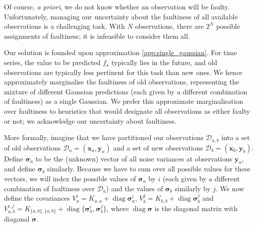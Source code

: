 \documentclass{article} %
\newcommand{\deq}{=}
\newcommand{\cm}[1]{\ensuremath{\mathcal{#1}}}
\newcommand{\bm}[1]{\ensuremath{\mathbf{#1}}}
\newcommand{\data}{\ensuremath{\cm{D}}}
\newcommand{\vect}[1]{\bm{#1}}
\newcommand{\vy}{\vect{y}}
\newcommand{\vx}{\vect{x}}
\newcommand{\vs}{\vect{\sigma}}
\newcommand{\st}{_{\star}}
\DeclareMathOperator{\diag}{diag}
\begin{document}
Of course, {\it a priori}, we do not know whether an
observation will be faulty.  Unfortunately, managing our uncertainty
about the faultiness of all available observations is a
challenging task. With $N$ observations, there are $2^N$
possible assignments of faultiness; it is infeasible to consider them all.

Our solution is founded upon approximation \ref{app:single_gaussian}. 
For time series, the value to be predicted $f\st$
typically lies in the future, and old observations are
typically less pertinent for this task than new ones. We hence approximately marginalise the faultiness of old observations, representing the mixture of different Gaussian predictions (each given by a different combination of faultiness) as a single Gaussian.
We prefer this approximate marginalisation over
faultiness to heuristics that would designate all
observations as either faulty or not; we acknowledge our
uncertainty about faultiness.

More formally, imagine that we have partitioned our observations
$\data_{a,b}$ into a set of old observations
$\data_a\deq(\vx_a,\vy_a)$ and a set of new observations $\data_b
\deq (\vx_b,\vy_b)$. Define $\vs_{a}$ to be the (unknown) vector of
all noise variances at observations $\vy_{a}$, and define $\vs_{b}$
similarly. Because we have to sum over all possible values for these
vectors, we will index the possible values of
$\vs_{a}$ by $i$ (each given by a different combination of
faultiness over $\data_a$) and the values of $\vs_{b}$ similarly by
$j$. We now define the covariances
 $V_a^i  \deq K_{a,a} + \diag \vs_{a}^i$,
 $V_b^j  \deq K_{b,b} + \diag \vs_{b}^j$ and
 $V_{a,b}^{i,j} \deq K_{\{a,b\},\{a,b\}} + \diag \{\vs_{a}^i,\vs_{b}^j\}$,
where $\diag \vs$ is the diagonal matrix with diagonal $\vs$. 
\end{document}
